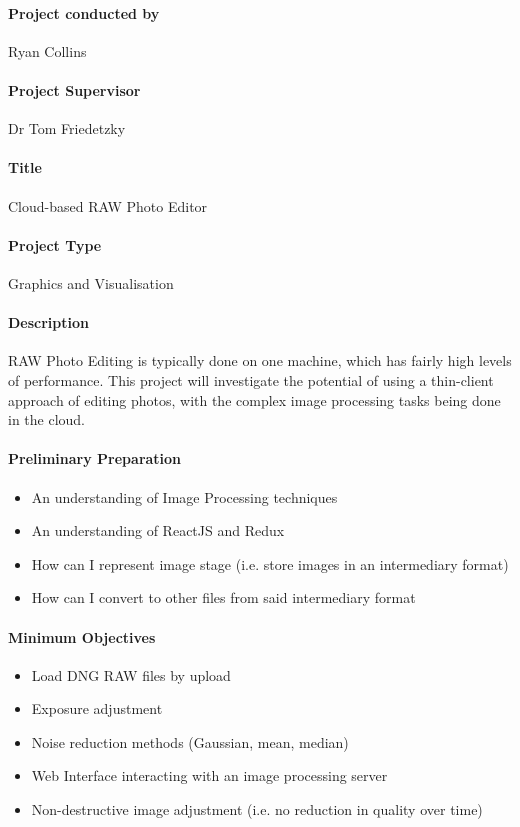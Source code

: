 \documentclass{article}
\begin{document}
    \paragraph{Project conducted by}
        Ryan Collins
    \paragraph{Project Supervisor}
        Dr Tom Friedetzky
    \paragraph{Title}
        Cloud-based RAW Photo Editor
    \paragraph{Project Type}
        Graphics and Visualisation
    \paragraph{Description}
        RAW Photo Editing is typically done on one machine, which has fairly high
        levels of performance. This project will investigate the potential of using
        a thin-client approach of editing photos, with the complex image processing
        tasks being done in the cloud.
    \paragraph{Preliminary Preparation}
        \begin{itemize}
          \item An understanding of Image Processing techniques
          \item An understanding of ReactJS and Redux
          \item How can I represent image stage (i.e. store images in an intermediary format)
          \item How can I convert to other files from said intermediary format
        \end{itemize}
    \paragraph{Minimum Objectives}
        \begin{itemize}
          \item Load DNG RAW files by upload
          \item Exposure adjustment
          \item Noise reduction methods (Gaussian, mean, median)
          \item Web Interface interacting with an image processing server
          \item Non-destructive image adjustment (i.e. no reduction in quality over time)
        \end{itemize}
\end{document}
